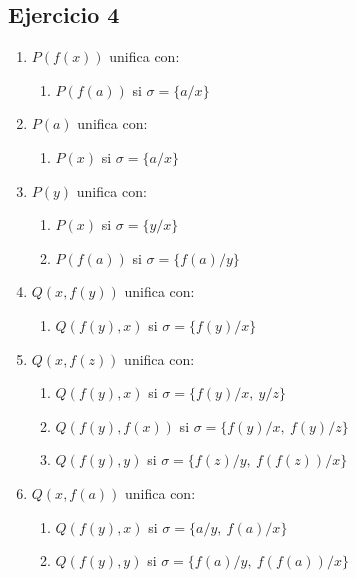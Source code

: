 \documentclass[10pt,a4paper]{article}
\begin{document}
\subsection{Ejercicio 4}
\begin{multicols}{2}
\begin{enumerate}
    \item $P(f(x)) $ unifica con:
        \begin{enumerate}
        \item $P(f(a))$ si $\sigma = \{a/x\}$
        \end{enumerate}
    \item $P(a) $ unifica con:
        \begin{enumerate}
            \item $P(x)$ si $\sigma =\{a/x\}$
        \end{enumerate}
    \item $P(y) $ unifica con:
        \begin{enumerate}
            \item $P(x) $ si $\sigma = \{y/x\}$
            \item $P(f(a)) $ si $\sigma = \{f(a)/y\}$
        \end{enumerate}
    \vfill\null
    \columnbreak
    \item $Q(x,f(y)) $ unifica con:
    \begin{enumerate}
        \item $Q(f(y),x)$ si $\sigma = \{f(y)/x\}$
    \end{enumerate}
    \item $Q(x,f(z)) $ unifica con:
    \begin{enumerate}
        \item $Q(f(y),x)$ si $\sigma = \{f(y)/x,~y/z\}$
        \item $Q(f(y),f(x))$ si $\sigma = \{f(y)/x,~f(y)/z\}$
        \item $Q(f(y),y)$ si $\sigma = \{f(z)/y,~f(f(z))/x\}$
    \end{enumerate}
    \item $Q(x,f(a)) $ unifica con:
        \begin{enumerate}
            \item $Q(f(y),x) $ si $\sigma = \{a/y,~f(a)/x\}$
            \item $Q(f(y),y) $ si $\sigma = \{ f(a)/y,~f(f(a))/x\}$
        \end{enumerate}
    \end{enumerate}
\end{multicols}
\end{document}
